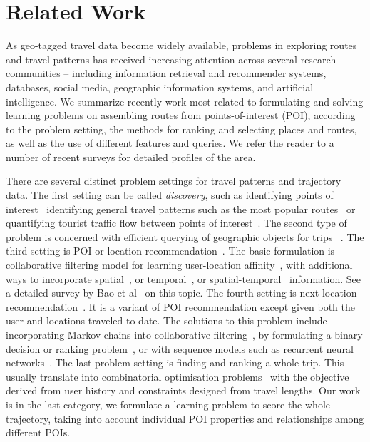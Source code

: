 
\section{Related Work}
\label{sec:relatedwork}

As geo-tagged travel data become widely available, problems in exploring routes and travel patterns has received increasing attention across several research communities -- including information retrieval and recommender systems, databases, social media, geographic information systems, and artificial intelligence. 
We summarize recently work most related to formulating and solving learning problems on assembling routes 
from points-of-interest (POI), according to the problem setting, the methods for ranking and selecting places and routes, as well as the use of different features and queries. We refer the reader to a number of recent surveys\cite{bao2015recommendations,zheng2015trajectory,zheng2014urban} for detailed profiles of the area.

There are several distinct problem settings for travel patterns and trajectory data. 
The first setting can be called {\em discovery}, such as identifying points of interest~\cite{zheng2009mining,li2015instagram} identifying general travel patterns such as the most popular routes~\cite{lu2010photo2trip} or 
quantifying tourist traffic flow between points of interest~\cite{zheng2012patterns}. 
The second type of problem is concerned with efficient querying of geographic objects for trips ~\cite{hashem2015efficient}. 
The third setting is POI or location recommendation~\cite{bao2015recommendations,yin2015joint}. The basic formulation is collaborative filtering model for learning user-location affinity~\cite{shi2011personalized}, with additional ways to incorporate spatial~\cite{lian2014geomf,liu2014exploiting}, or temporal~\cite{yuan2013timeaware,hsieh2014mining,gao2013temporal}, or spatial-temporal~\cite{yuan2014graph} information. See a detailed survey by Bao et al~\cite{bao2015recommendations} on this topic. 
The fourth setting is next location recommendation~\cite{ijcai13,aaai16,baraglia2013learnext,zhang2015location}. It is a variant of POI recommendation except given both the user and locations traveled to date. The solutions to this problem include incorporating Markov chains into collaborative filtering~\cite{fpmc10,ijcai13,zhang2015location}, by formulating a binary decision or ranking problem~\cite{baraglia2013learnext}, or with sequence models such as recurrent neural networks~\cite{aaai16}. 
The last problem setting is finding and ranking a whole trip. This usually translate into combinatorial optimisation problems~\cite{ijcai15,lu2012personalized} with the objective derived from user history and constraints designed from travel lengths. 
Our work is in the last category, we formulate a learning problem to score the whole trajectory, taking into account individual POI properties and relationships among different POIs. 

